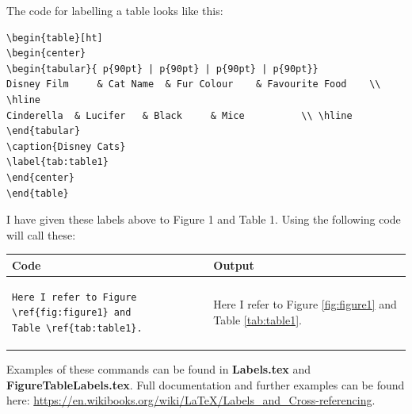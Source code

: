 \documentclass[10pt, titlepage]{article}
\begin{document}
The code for labelling a table looks like this:
\begin{lstlisting}
\begin{table}[ht]
\begin{center}
\begin{tabular}{ p{90pt} | p{90pt} | p{90pt} | p{90pt}} 
Disney Film 	& Cat Name 	& Fur Colour 	& Favourite Food	\\ \hline
Cinderella 	& Lucifer 	& Black 	& Mice 			\\ \hline
\end{tabular}
\caption{Disney Cats}
\label{tab:table1}
\end{center}
\end{table}
\end{lstlisting}

I have given these labels above to Figure 1 and Table 1. Using the following code will call these:\\
\begin{tabular}{|p{240pt}|p{240pt}|}\hline
\textbf{Code}  & \textbf{Output} \\\hline
\begin{lstlisting}
Here I refer to Figure \ref{fig:figure1} and 
Table \ref{tab:table1}.
\end{lstlisting} &
 \vspace{8pt}
Here I refer to Figure \ref{fig:figure1} and Table \ref{tab:table1}.\\\hline
\end{tabular}

Examples of these commands can be found in \textbf{Labels.tex} and \textbf{FigureTableLabels.tex}. Full documentation and further examples can be found here: \url{https://en.wikibooks.org/wiki/LaTeX/Labels_and_Cross-referencing}. 
\end{document}
